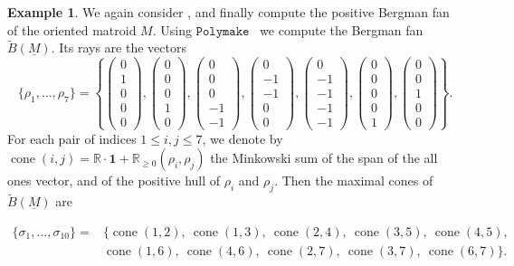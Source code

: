 \documentclass{article}
\theoremstyle{definition}
\newtheorem{example}[theorem]{Example}
\newcommand{\R}{\mathbb{R}}
\begin{document}
\begin{example}
We again consider ,
and finally compute the positive Bergman fan of the oriented matroid $M$. 
Using $\texttt{Polymake}$~\cite{POLYMAKE} we compute the Bergman fan $\widetilde{B}(\underline{M})$.
Its rays are the vectors
\[
\{\rho_1, \dots, \rho_7\} = 
\left\{
 \begin{pmatrix}0\\ 1\\ 0\\ 0\\ 0 \end{pmatrix},
 \begin{pmatrix}0\\ 0\\ 0\\ 1\\ 0 \end{pmatrix},
 \begin{pmatrix}0\\ 0\\ 0\\ -1\\ -1 \end{pmatrix},
 \begin{pmatrix}0\\ -1\\ -1\\ 0\\ 0 \end{pmatrix},
 \begin{pmatrix}0\\ -1\\ -1\\ -1\\ -1 \end{pmatrix},
 \begin{pmatrix}0\\ 0\\ 0\\ 0\\ 1 \end{pmatrix},
 \begin{pmatrix}0\\ 0\\ 1\\ 0\\ 0 \end{pmatrix}
 \right\}.
\]
For each pair of indices $1 \leq i, j \leq 7$, we denote by $\operatorname{cone}(i,j) = \R \cdot \mathbf{1} + \R_{\geq 0}(\rho_i, \rho_j)$ the Minkowski sum of the span of the all ones vector, and of the positive hull of $\rho_i$ and $\rho_j$. Then the maximal cones of $\widetilde{B}(\underline{M})$ are

\begin{equation*}
  \begin{aligned}
\{\sigma_1, \dots, \sigma_{10}\} = 
&\{
\operatorname{cone}(1, 2), \
\operatorname{cone}(1, 3), \
\operatorname{cone}(2, 4), \
\operatorname{cone}(3, 5), \
\operatorname{cone}(4, 5), \\
&\operatorname{cone}(1, 6), \
\operatorname{cone}(4, 6), \
\operatorname{cone}(2, 7), \
\operatorname{cone}(3, 7), \
\operatorname{cone}(6, 7) \}.
  \end{aligned}
\end{equation*}
\end{example}
\end{document}
